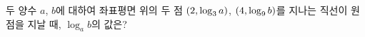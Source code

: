 두 양수 $a$, $b$에 대하여 좌표평면 위의 두 점 $(2{,}\mkern3mu\mathopen{}\log_3 a)$, $(4{,}\mkern3mu\mathopen{}\log_9 b)$를 지나는 직선이 원점을 지날 때, $\log_a b$의 값은? 
